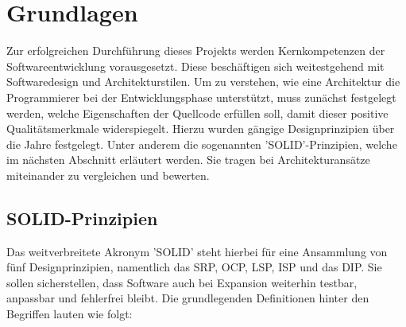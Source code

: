 

\chapter{Grundlagen}

Zur erfolgreichen Durchführung dieses Projekts werden Kernkompetenzen der Softwareentwicklung vorausgesetzt. Diese beschäftigen sich weitestgehend mit Softwaredesign und Architekturstilen. Um zu verstehen, wie eine Architektur die Programmierer bei der Entwicklungsphase unterstützt, muss zunächst festgelegt werden, welche Eigenschaften der Quellcode erfüllen soll, damit dieser positive Qualitätsmerkmale widerspiegelt. Hierzu wurden gängige Designprinzipien über die Jahre festgelegt. Unter anderem die sogenannten 'SOLID'-Prinzipien, welche im nächsten Abschnitt erläutert werden. Sie tragen bei Architekturansätze miteinander zu vergleichen und bewerten.

\section{SOLID-Prinzipien}

Das weitverbreitete Akronym 'SOLID' steht hierbei für eine Ansammlung von fünf Designprinzipien, namentlich das \acrfull{SRP}, \acrfull{OCP}, \acrfull{LSP}, \acrfull{ISP} und das \acrfull{DIP}. Sie sollen sicherstellen, dass Software auch bei Expansion weiterhin testbar, anpassbar und fehlerfrei bleibt. Die grundlegenden Definitionen hinter den Begriffen lauten wie folgt:

